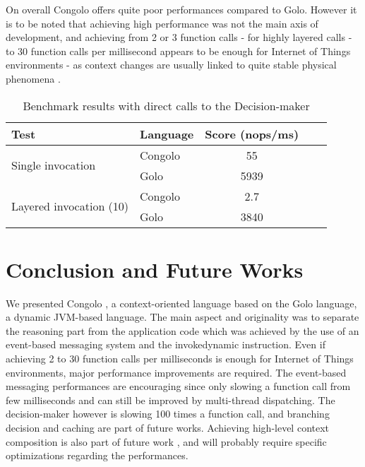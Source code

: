 \documentclass{sig-alternate}
\begin{document}
On overall Congolo offers quite poor performances compared to Golo. However it is to be noted that achieving high performance was not the main axis of development, and achieving from 2 or 3 function calls - for highly layered calls - to 30 function calls per millisecond appears to be enough for Internet of Things environments - as context changes are usually linked to quite stable physical phenomena \cite{RELEASeD-2010-857551}.

\begin{table}
\begin{adjustbox}{center}
\begin{tabular}{l p{2cm} | c | c | c |}
        \hline
                Test & Language & Score (nops/ms) \\
                
        \hline
        \multirow{2}{*}{Single invocation} 
                & Congolo & 55 \\
                & Golo & 5939 \\

        \hline
    \multirow{2}{*}{Layered invocation (10)} 
                & Congolo & 2.7 \\
                & Golo & 3840 \\                
\end{tabular}
\end{adjustbox}
        \caption{Benchmark results with direct calls to the Decision-maker}
        \label{table:benchmarking_direct}
\end{table}
 
\section{Conclusion and Future Works}

We presented Congolo \cite{bmaingret_congolo_2014}, a context-oriented language based on the Golo language, a dynamic JVM-based language. The main aspect and originality was to separate the reasoning part from the application code which was achieved by the use of an event-based messaging system and the invokedynamic instruction. Even if achieving 2 to 30 function calls per milliseconds is enough for Internet of Things environments, major performance improvements are required. The event-based messaging performances are encouraging since only slowing a function call from few milliseconds and can still be improved by multi-thread dispatching. The decision-maker however is slowing 100 times a function call, and branching decision and caching are part of future works. Achieving high-level context composition is also part of future work \cite{vallejos2010}, and will probably require specific optimizations regarding the performances. 


\end{document}
